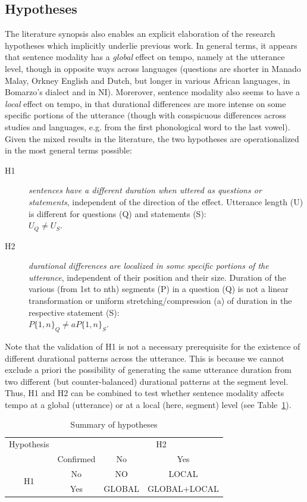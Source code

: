 \subsection{Hypotheses}\label{sec431}
The literature synopsis also enables an explicit elaboration of the research hypotheses which implicitly underlie previous work. In general terms, it appears that sentence modality has a \textit{global} effect on tempo, namely at the utterance level, though in opposite ways across languages (questions are shorter in Manado Malay, Orkney English and Dutch, but longer in various African languages, in Bomarzo's dialect and in NI). Morerover, sentence modality also seems to have a \textit{local} effect on tempo, in that durational differences are more intense on some specific portions of the utterance (though with conspicuous differences across studies and languages, e.g. from the first phonological word to the last vowel). Given the mixed results in the literature, the two hypotheses are operationalized in the most general terms possible: 

\begin{description}
   \item[H1] \textit{sentences have a different duration when uttered as questions or statements}, independent of the direction of the  effect. Utterance length (U) is different for questions (Q) and statements (S):\\ $U_{Q} \neq U_{S}$.
   \item[H2] \textit{durational differences are localized in some specific portions of the utterance}, independent of their position and their size. Duration of the various (from 1st to nth) segments (P) in a question (Q) is not a linear transformation or uniform stretching/compression (a) of duration in the respective statement (S):\\ $P\{1,n\}_{Q} \neq aP\{1,n\}_{S}$.
\end{description}

Note that the validation of H1 is not a necessary prerequisite for the existence of different durational patterns across the utterance. This is because we cannot exclude a priori the possibility of generating the same utterance duration from two different (but counter-balanced) durational patterns at the segment level. Thus, H1 and H2 can be combined to test whether sentence modality affects tempo at a global (utterance) or at a local (here, segment) level (see Table~\ref{tab42}).

\begin{table}[h]
\centering
\begin{tabular}{c c | c c}
\mytoprule
Hypothesis & & \multicolumn{2}{c}{H2}\\
& Confirmed & No & Yes\\
\midrule
\multirow{2}{*}{H1} & No & NO & LOCAL\\
 & Yes & GLOBAL & GLOBAL+LOCAL\\
\end{tabular}
\caption{Summary of hypotheses}
\label{tab42}\end{table}

